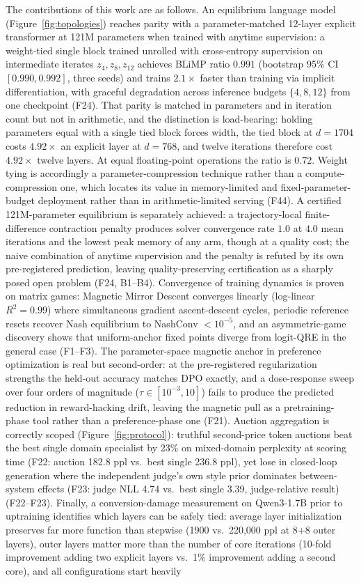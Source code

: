 The contributions of this work are as follows. An equilibrium language model (Figure~\ref{fig:topologies}) reaches parity with a parameter-matched 12-layer explicit transformer at 121M parameters when trained with anytime supervision: a weight-tied single block trained unrolled with cross-entropy supervision on intermediate iterates $z_4, z_8, z_{12}$ achieves BLiMP ratio $0.991$ (bootstrap 95\% CI $[0.990, 0.992]$, three seeds) and trains $2.1\times$ faster than training via implicit differentiation, with graceful degradation across inference budgets $\{4, 8, 12\}$ from one checkpoint (F24). That parity is matched in parameters and in iteration count but not in arithmetic, and the distinction is load-bearing: holding parameters equal with a single tied block forces width, the tied block at $d = 1704$ costs $4.92\times$ an explicit layer at $d = 768$, and twelve iterations therefore cost $4.92\times$ twelve layers. At equal floating-point operations the ratio is $0.72$. Weight tying is accordingly a parameter-compression technique rather than a compute-compression one, which locates its value in memory-limited and fixed-parameter-budget deployment rather than in arithmetic-limited serving (F44). A certified 121M-parameter equilibrium is separately achieved: a trajectory-local finite-difference contraction penalty produces solver convergence rate $1.0$ at $4.0$ mean iterations and the lowest peak memory of any arm, though at a quality cost; the naive combination of anytime supervision and the penalty is refuted by its own pre-registered prediction, leaving quality-preserving certification as a sharply posed open problem (F24, B1--B4). Convergence of training dynamics is proven on matrix games: Magnetic Mirror Descent converges linearly (log-linear $R^2 = 0.99$) where simultaneous gradient ascent-descent cycles, periodic reference resets recover Nash equilibrium to NashConv $< 10^{-5}$, and an asymmetric-game discovery shows that uniform-anchor fixed points diverge from logit-QRE in the general case (F1--F3). The parameter-space magnetic anchor in preference optimization is real but second-order: at the pre-registered regularization strengths the held-out accuracy matches DPO exactly, and a dose-response sweep over four orders of magnitude ($\tau \in [10^{-3}, 10]$) fails to produce the predicted reduction in reward-hacking drift, leaving the magnetic pull as a pretraining-phase tool rather than a preference-phase one (F21). Auction aggregation is correctly scoped (Figure~\ref{fig:protocol}): truthful second-price token auctions beat the best single domain specialist by 23\% on mixed-domain perplexity at scoring time (F22: auction 182.8 ppl vs.\ best single 236.8 ppl), yet lose in closed-loop generation where the independent judge's own style prior dominates between-system effects (F23: judge NLL 4.74 vs.\ best single 3.39, judge-relative result) (F22--F23). Finally, a conversion-damage measurement on Qwen3-1.7B prior to uptraining identifies which layers can be safely tied: average layer initialization preserves far more function than stepwise (1900 vs.\ 220,000 ppl at 8+8 outer layers), outer layers matter more than the number of core iterations (10-fold improvement adding two explicit layers vs.\ 1\% improvement adding a second core), and all configurations start heavily 
